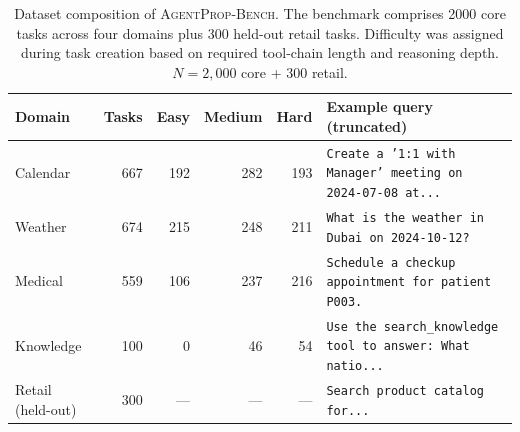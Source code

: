 \begin{table}[H]
\centering
\caption{Dataset composition of \textsc{AgentProp-Bench}. The benchmark comprises 2000 core tasks across four domains plus 300 held-out retail tasks. Difficulty was assigned during task creation based on required tool-chain length and reasoning depth. $N = 2{,}000$ core + 300 retail.}
\label{tab:dataset}
\begin{tabular}{l r r r r l}
\toprule
Domain & Tasks & Easy & Medium & Hard & Example query (truncated) \\
\midrule
Calendar & 667 & 192 & 282 & 193 & \texttt{Create a '1:1 with Manager' meeting on 2024-07-08 at...} \\
Weather & 674 & 215 & 248 & 211 & \texttt{What is the weather in Dubai on 2024-10-12?} \\
Medical & 559 & 106 & 237 & 216 & \texttt{Schedule a checkup appointment for patient P003.} \\
Knowledge & 100 & 0 & 46 & 54 & \texttt{Use the search\_knowledge tool to answer:  What natio...} \\
\midrule
Retail (held-out) & 300 & --- & --- & --- & \texttt{Search product catalog for...} \\
\bottomrule
\end{tabular}
\end{table}